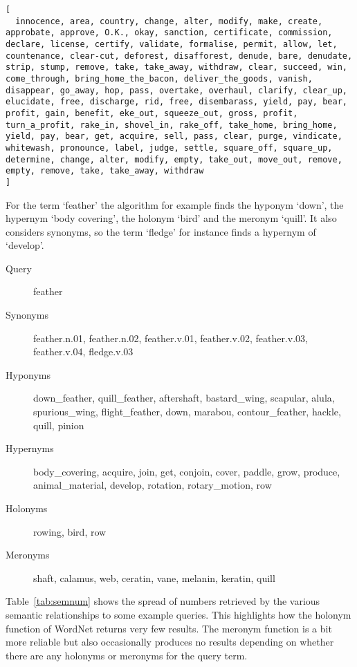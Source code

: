 \begin{verbatim}
[
  innocence, area, country, change, alter, modify, make, create, approbate, approve, O.K., okay, sanction, certificate, commission, declare, license, certify, validate, formalise, permit, allow, let, countenance, clear-cut, deforest, disafforest, denude, bare, denudate, strip, stump, remove, take, take_away, withdraw, clear, succeed, win, come_through, bring_home_the_bacon, deliver_the_goods, vanish, disappear, go_away, hop, pass, overtake, overhaul, clarify, clear_up, elucidate, free, discharge, rid, free, disembarass, yield, pay, bear, profit, gain, benefit, eke_out, squeeze_out, gross, profit, turn_a_profit, rake_in, shovel_in, rake_off, take_home, bring_home, yield, pay, bear, get, acquire, sell, pass, clear, purge, vindicate, whitewash, pronounce, label, judge, settle, square_off, square_up, determine, change, alter, modify, empty, take_out, move_out, remove, empty, remove, take, take_away, withdraw
]
\end{verbatim}

For the term `feather' the algorithm for example finds the hyponym `down', the hypernym `body covering', the holonym `bird' and the meronym `quill'. It also considers synonyms, so the term `fledge' for instance finds a hypernym of `develop'.

\begin{description}
  \item[Query] feather 
  \item[Synonyms] feather.n.01, feather.n.02, feather.v.01, feather.v.02, feather.v.03, feather.v.04, fledge.v.03
  \item[Hyponyms] down\_feather, quill\_feather, aftershaft, bastard\_wing, scapular, alula, spurious\_wing, flight\_feather, down, marabou, contour\_feather, hackle, quill, pinion
  \item[Hypernyms] body\_covering, acquire, join, get, conjoin, cover, paddle, grow, produce, animal\_material, develop, rotation, rotary\_motion, row
  \item[Holonyms] rowing, bird, row
  \item[Meronyms] shaft, calamus, web, ceratin, vane, melanin, keratin, quill
\end{description}

Table~\ref{tab:semnum} shows the spread of numbers retrieved by the various semantic relationships to some example queries. This highlights how the holonym function of WordNet returns very few results. The meronym function is a bit more reliable but also occasionally produces no results depending on whether there are any holonyms or meronyms for the query term.

